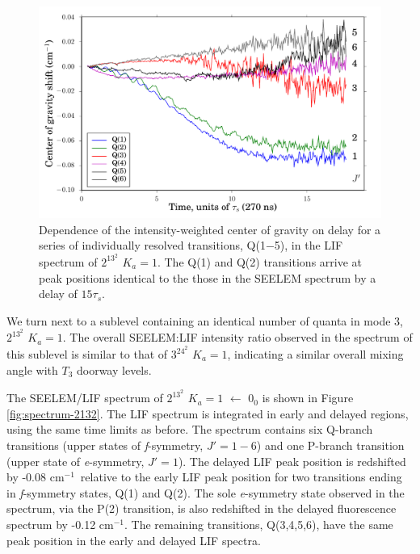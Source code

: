 \documentclass[12pt]{mitthesis}
\newcommand{\rcm}{cm$^{-1}$}
\newcommand{\Ka}[1]{$K_a\!\!=\!#1$}
\begin{document}
\begin{figure}
  \caption{Dependence of the intensity-weighted center of gravity on
    delay for a series of individually resolved transitions, Q(1$-$5),
    in the LIF spectrum of $2^13^2$ \Ka{1}.  The Q(1) and Q(2)
    transitions arrive at peak positions identical to the those in the
    SEELEM spectrum by a delay of $15\tau_s$.}
  \label{fig:2132-q123456-cog-delay}
  \centering
  \vspace{1cm}
  \includegraphics[width=6in]{2132-q123456-cog-delay.pdf}
\end{figure}


We turn next to a sublevel containing an identical number of quanta in
mode 3, $2^13^2$ \Ka{1}.  The overall SEELEM:LIF intensity ratio
observed in the spectrum of this sublevel is similar to that of
$3^24^2$ \Ka{1}, indicating a similar overall mixing angle with $T_3$
doorway levels.

The SEELEM/LIF spectrum of $2^13^2$ \Ka{1} $\leftarrow$ $0_0$ is shown
in Figure \ref{fig:spectrum-2132}.  The LIF spectrum is integrated in
early and delayed regions, using the same time limits as before.  The
spectrum contains six Q-branch transitions (upper states of
\emph{f}-symmetry, $J'=1-6$) and one P-branch transition (upper
state of \emph{e}-symmetry, $J'=1$).  The delayed LIF peak position is
redshifted by -0.08 \rcm\ relative to the early LIF peak position for
two transitions ending in \emph{f}-symmetry states, Q(1) and Q(2).
The sole \emph{e}-symmetry state observed in the spectrum, via the
P(2) transition, is also redshifted in the delayed fluorescence
spectrum by -0.12 \rcm.  The remaining transitions, Q(3,4,5,6), have
the same peak position in the early and delayed LIF spectra.
\end{document}
